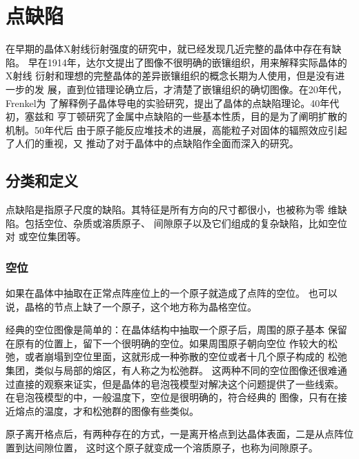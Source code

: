\chapter{点缺陷}
    在早期的晶体X射线衍射强度的研究中，就已经发现几近完整的晶体中存在有缺陷。
    早在1914年，达尔文提出了图像不很明确的嵌镶组织，用来解释实际晶体的X射线
    衍射和理想的完整晶体的差异嵌镶组织的概念长期为人使用，但是没有进一步的发
    展，直到位错理论确立后，才清楚了嵌镶组织的确切图像。在20年代，Frenkel为
    了解释例子晶体导电的实验研究，提出了晶体的点缺陷理论。40年代初，塞兹和
    亨丁顿研究了金属中点缺陷的一些基本性质，目的是为了阐明扩散的机制。50年代后
    由于原子能反应堆技术的进展，高能粒子对固体的辐照效应引起了人们的重视，又
    推动了对于晶体中的点缺陷作全面而深入的研究。

    \section{分类和定义}
        点缺陷是指原子尺度的缺陷。其特征是所有方向的尺寸都很小，也被称为零
        维缺陷。包括空位、杂质或溶质原子、
        间隙原子以及它们组成的复杂缺陷，比如空位对
        或空位集团等。

        \subsection{空位}
            如果在晶体中抽取在正常点阵座位上的一个原子就造成了点阵的空位。
            也可以说，晶格的节点上缺了一个原子，这个地方称为晶格空位。

            经典的空位图像是简单的：在晶体结构中抽取一个原子后，周围的原子基本
            保留在原有的位置上，留下一个很明确的空位。如果周围原子朝向空位
            作较大的松弛，或者崩塌到空位里面，这就形成一种弥散的空位或者十几个原子构成的
            松弛集团，类似与局部的熔区，有人称之为松弛群。
            这两种不同的空位图像还很难通过直接的观察来证实，但是晶体的皂泡筏模型对解决这个问题提供了一些线索。
            在皂泡筏模型的\cite{book:1106816}中，一般温度下，空位是很明确的，符合经典的
            图像，只有在接近熔点的温度，才和松弛群的图像有些类似。

            原子离开格点后，有两种存在的方式，一是离开格点到达晶体表面，二是从点阵位置到达间隙位置，
            这时这个原子就变成一个溶质原子，也称为间隙原子。

